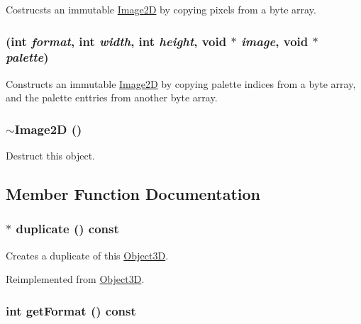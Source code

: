 Costrucsts an immutable \hyperlink{classm3g_1_1Image2D}{Image2D} by copying pixels from a byte array. \hypertarget{classm3g_1_1Image2D_f498914ceac20ff9b1708c55ff1484e6}{
\subsubsection[{Image2D}]{ (int {\em format}, \/  int {\em width}, \/  int {\em height}, \/  void $\ast$ {\em image}, \/  void $\ast$ {\em palette})}}
\label{classm3g_1_1Image2D_f498914ceac20ff9b1708c55ff1484e6}


Constructs an immutable \hyperlink{classm3g_1_1Image2D}{Image2D} by copying palette indices from a byte array, and the palette enttries from another byte array. \hypertarget{classm3g_1_1Image2D_7ac703fe7edbb053dd2246ea1bb43200}{
\subsubsection[{$\sim$Image2D}]{\setlength{\rightskip}{0pt plus 5cm}$\sim${\bf Image2D} ()}}
\label{classm3g_1_1Image2D_7ac703fe7edbb053dd2246ea1bb43200}


Destruct this object. 

\subsection{Member Function Documentation}
\hypertarget{classm3g_1_1Image2D_47eefc8e0b0b3d4c5b16b3f57285fe6b}{
\subsubsection[{duplicate}]{ $\ast$ duplicate () const}}
\label{classm3g_1_1Image2D_47eefc8e0b0b3d4c5b16b3f57285fe6b}


Creates a duplicate of this \hyperlink{classm3g_1_1Object3D}{Object3D}. 

Reimplemented from \hyperlink{classm3g_1_1Object3D_a25110dac934f867b83b73ad4741a0f4}{Object3D}.\hypertarget{classm3g_1_1Image2D_c08e2752176d267cc4429d4d185975b8}{
\subsubsection[{getFormat}]{\setlength{\rightskip}{0pt plus 5cm}int getFormat () const}}
\label{classm3g_1_1Image2D_c08e2752176d267cc4429d4d185975b8}


